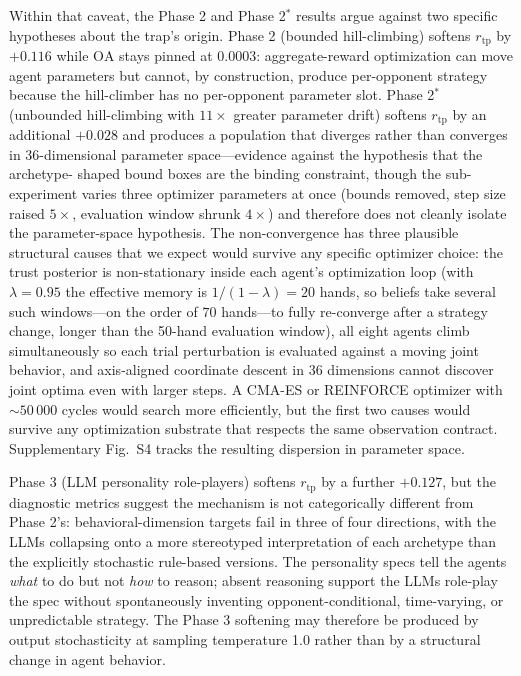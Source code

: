 \documentclass[journal]{IEEEtran}
\newcommand{\rtp}{\ensuremath{r_{\mathrm{tp}}}}
\begin{document}
Within that caveat, the Phase 2 and Phase 2$^{*}$ results argue
against two specific hypotheses about the trap's origin. Phase 2
(bounded hill-climbing) softens $\rtp$ by $+0.116$ while
$\mathrm{OA}$ stays pinned at $0.0003$: aggregate-reward
optimization can move agent parameters but cannot, by
construction, produce per-opponent strategy because the
hill-climber has no per-opponent parameter slot. Phase 2$^{*}$
(unbounded hill-climbing with $11\times$ greater parameter drift)
softens $\rtp$ by an additional $+0.028$ and produces a population
that diverges rather than converges in 36-dimensional parameter
space---evidence against the hypothesis that the archetype-
shaped bound boxes are the binding constraint, though the
sub-experiment varies three optimizer parameters at once
(bounds removed, step size raised $5\times$, evaluation window
shrunk $4\times$) and therefore does not cleanly isolate the
parameter-space hypothesis. The non-convergence has three
plausible structural causes that we expect would survive any
specific optimizer choice: the trust posterior is non-stationary
inside each agent's optimization loop (with $\lambda = 0.95$ the
effective memory is $1/(1-\lambda) = 20$ hands, so beliefs take
several such windows---on the order of $70$ hands---to fully
re-converge after a strategy change, longer than the 50-hand
evaluation window), all eight
agents climb simultaneously so each trial perturbation is
evaluated against a moving joint behavior, and axis-aligned
coordinate descent in 36 dimensions cannot discover joint optima
even with larger steps. A CMA-ES or REINFORCE optimizer with
${\sim}50\,000$ cycles would search more efficiently, but the
first two causes would survive any optimization substrate that
respects the same observation contract. Supplementary Fig.~S4
tracks the resulting dispersion in parameter space.

Phase 3 (LLM personality role-players) softens $\rtp$ by a
further $+0.127$, but the diagnostic metrics suggest the
mechanism is not categorically different from Phase 2's:
behavioral-dimension targets fail in three of four directions,
with the LLMs collapsing onto a more stereotyped interpretation
of each archetype than the explicitly stochastic rule-based
versions. The personality specs tell the agents \textit{what} to
do but not \textit{how} to reason; absent reasoning support the
LLMs role-play the spec without spontaneously inventing
opponent-conditional, time-varying, or unpredictable strategy.
The Phase 3 softening may therefore be produced by output
stochasticity at sampling temperature 1.0 rather than by a
structural change in agent behavior.
\end{document}
